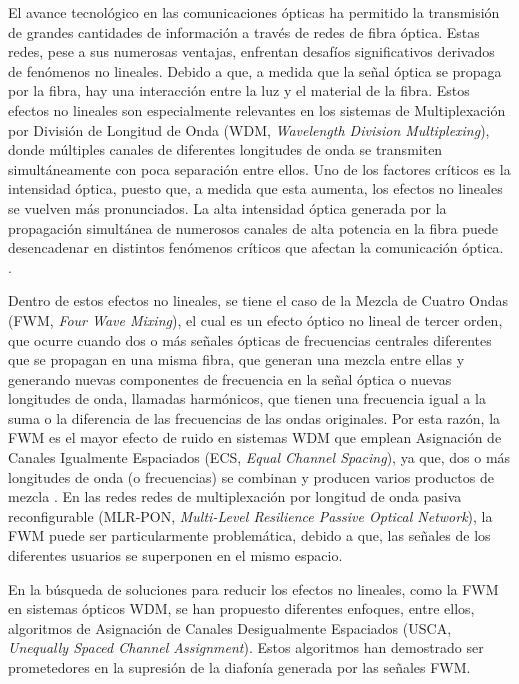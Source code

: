 \justify %
\vfill %


El avance tecnológico en las comunicaciones ópticas ha permitido la transmisión de grandes cantidades de información a través de redes de fibra óptica. Estas redes, pese a sus numerosas ventajas, enfrentan desafíos significativos derivados de fenómenos no lineales. Debido a que, a medida que la señal óptica se propaga por la fibra, hay una interacción entre la luz y el material de la fibra. Estos efectos no lineales son especialmente relevantes en los sistemas de Multiplexación por División de Longitud de Onda (WDM, \textit{Wavelength Division Multiplexing}), donde múltiples canales de diferentes longitudes de onda se transmiten simultáneamente con poca separación entre ellos. Uno de los factores críticos es la intensidad óptica, puesto que, a medida que esta aumenta, los efectos no lineales se vuelven más pronunciados. La alta intensidad óptica generada por la propagación simultánea de numerosos canales de alta potencia en la fibra puede desencadenar en distintos fenómenos críticos que afectan la comunicación óptica. \cite{Toulouse} \cite{Sing}.

Dentro de estos efectos no lineales, se tiene el caso de la Mezcla de Cuatro Ondas (FWM, \textit{Four Wave Mixing}), el cual es un efecto óptico no lineal de tercer orden, que ocurre cuando dos o más señales ópticas de frecuencias centrales diferentes que se propagan en una misma fibra, que generan una mezcla entre ellas y generando nuevas componentes de frecuencia en la señal óptica o nuevas longitudes de onda, llamadas harmónicos, que tienen una frecuencia igual a la suma o la diferencia de las frecuencias de las ondas originales. Por esta razón, la FWM es el mayor efecto de ruido en sistemas WDM que emplean Asignación de Canales Igualmente Espaciados (ECS, \textit{Equal Channel Spacing}), ya que, dos o más longitudes de onda (o frecuencias) se combinan y producen varios productos de mezcla \cite{Bansal}. En las redes redes de multiplexación por longitud de onda pasiva reconfigurable (MLR-PON, \textit{Multi-Level Resilience Passive Optical Network}), la FWM puede ser particularmente problemática, debido a que, las señales de los diferentes usuarios se superponen en el mismo espacio.

En la búsqueda de soluciones para reducir los efectos no lineales, como la FWM en sistemas ópticos WDM, se han propuesto diferentes enfoques, entre ellos, algoritmos de Asignación de Canales Desigualmente Espaciados (USCA, \textit{Unequally Spaced Channel Assignment}). Estos algoritmos han demostrado ser prometedores en la supresión de la diafonía generada por las señales FWM. 

